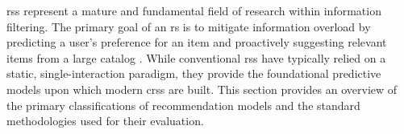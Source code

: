 \aclp{rs} represent a mature and fundamental field of research within information filtering. The primary goal of an \ac{rs} is to mitigate information overload by predicting a user's preference for an item and proactively suggesting relevant items from a large catalog \cite{BOOK:RS-HANDBOOK}. While conventional \acp{rs} have typically relied on a static, single-interaction paradigm, they provide the foundational predictive models upon which modern \acp{crs} are built. This section provides an overview of the primary classifications of recommendation models and the standard methodologies used for their evaluation.